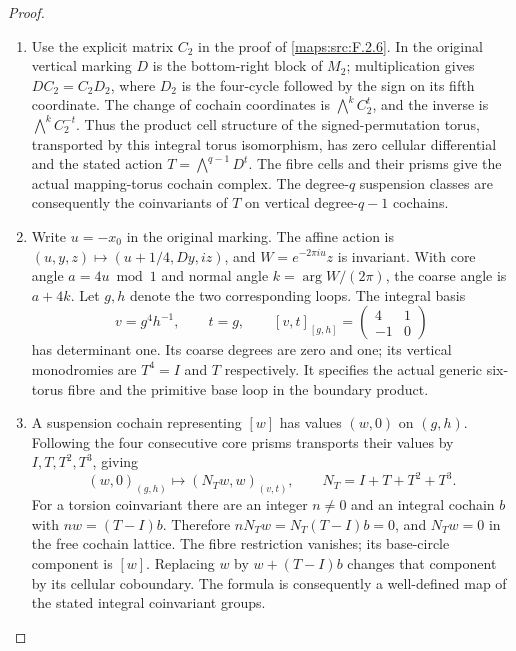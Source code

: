 \begin{proof}
\begin{enumerate}[label=\arabic*.]
\item Use the explicit matrix $C_2$ in the proof of
\cref{maps:src:F.2.6}.  In the original vertical marking $D$ is the
bottom-right block of $M_2$; multiplication gives
$DC_2=C_2D_2$, where $D_2$ is the four-cycle followed by the sign
on its fifth coordinate.  The change of cochain coordinates is
$\bigwedge^kC_2^t$, and the inverse is $\bigwedge^kC_2^{-t}$.
Thus the product cell structure of the signed-permutation torus,
transported by this integral torus isomorphism, has zero cellular
differential and the stated action $T=\bigwedge^{q-1}D^t$.
The fibre cells and their prisms give the actual mapping-torus
cochain complex.  The degree-$q$ suspension classes are consequently
the coinvariants of $T$ on vertical degree-$q-1$ cochains.

\item Write $u=-x_0$ in the original marking.  The affine action is
$(u,y,z)\mapsto(u+1/4,Dy,iz)$, and
$W=e^{-2\pi i u}z$ is invariant.  With core angle $a=4u\bmod1$
and normal angle $k=\arg W/(2\pi)$, the coarse angle is $a+4k$.
Let $g,h$ denote the two corresponding loops.  The integral basis
\[
 v=g^4h^{-1},\qquad t=g,
 \qquad [v,t]_{[g,h]}=\begin{pmatrix}4&1\\-1&0\end{pmatrix}
\]
has determinant one.  Its coarse degrees are zero and one; its
vertical monodromies are $T^4=I$ and $T$ respectively.
It specifies the actual generic six-torus fibre and the primitive
base loop in the boundary product.

\item A suspension cochain representing $[w]$ has values $(w,0)$
on $(g,h)$.  Following the four consecutive core prisms transports
their values by $I,T,T^2,T^3$, giving
\[
 (w,0)_{(g,h)}\longmapsto(N_Tw,w)_{(v,t)},
 \qquad N_T=I+T+T^2+T^3.
 \tag{FT.1}\label{maps:eq:FT.1}
\]
For a torsion coinvariant there are an integer $n\ne0$ and an
integral cochain $b$ with $nw=(T-I)b$.  Therefore
$nN_Tw=N_T(T-I)b=0$, and $N_Tw=0$ in the free cochain lattice.
The fibre restriction vanishes; its base-circle component is $[w]$.
Replacing $w$ by $w+(T-I)b$ changes that component by its cellular
coboundary.  The formula is consequently a well-defined map of the
stated integral coinvariant groups.


\end{enumerate}
\end{proof}
